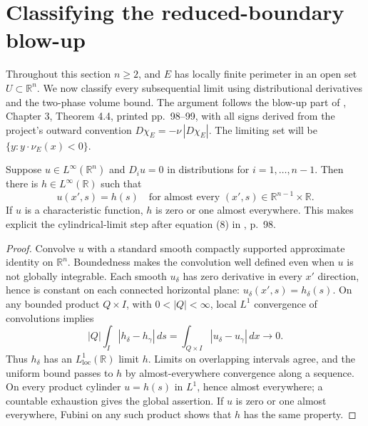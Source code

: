 \chapter{Classifying the reduced-boundary blow-up}\label{sec:perimeter-halfspace-classification}
Throughout this section $n\geq2$, and $E$ has locally finite perimeter in an open set $U\subset\mathbb R^n$.
We now classify every subsequential limit using distributional derivatives and the two-phase volume bound. The argument follows the blow-up part of \cite{Sim18}, Chapter 3, Theorem 4.4, printed pp.~98--99, with all signs derived from the project's outward convention $D\chi_E=-\nu\,|D\chi_E|$. The limiting set will be $\{y:y\cdot\nu_E(x)<0\}$.

\begin{lemma}\label{lem:distributional-one-direction}
Suppose $u\in L^\infty(\mathbb R^n)$ and $D_i u=0$ in distributions for $i=1,\ldots,n-1$. Then there is $h\in L^\infty(\mathbb R)$ such that
\[
 u(x',s)=h(s)\quad\text{for almost every }(x',s)\in\mathbb R^{n-1}\times\mathbb R.
\]
If $u$ is a characteristic function, $h$ is zero or one almost everywhere. This makes explicit the cylindrical-limit step after equation (8) in \cite{Sim18}, p.~98.
\end{lemma}
\begin{proof}
Convolve $u$ with a standard smooth compactly supported approximate identity on $\mathbb R^n$. Boundedness makes the convolution well defined even when $u$ is not globally integrable. Each smooth $u_\delta$ has zero derivative in every $x'$ direction, hence is constant on each connected horizontal plane: $u_\delta(x',s)=h_\delta(s)$. On any bounded product $Q\times I$, with $0<|Q|<\infty$, local $L^1$ convergence of convolutions implies
\[
 |Q|\int_I|h_\delta-h_\gamma|\,ds
 =\int_{Q\times I}|u_\delta-u_\gamma|\,dx\longrightarrow0.
\]
Thus $h_\delta$ has an $L^1_{\mathrm{loc}}(\mathbb R)$ limit $h$. Limits on overlapping intervals agree, and the uniform bound passes to $h$ by almost-everywhere convergence along a sequence. On every product cylinder $u=h(s)$ in $L^1$, hence almost everywhere; a countable exhaustion gives the global assertion. If $u$ is zero or one almost everywhere, Fubini on any such product shows that $h$ has the same property.
\end{proof}

